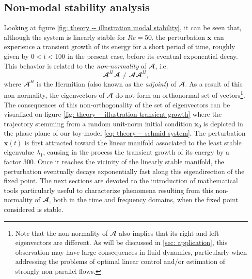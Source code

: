 
  \subsection{Non-modal stability analysis}
  \label{subsec: theory -- non-modal stability}

  Looking at figure \ref{fig: theory -- illustration modal stability}, it can be seen that, although the system is linearly stable for $Re=50$, the perturbation $\mathbf{x}$ can experience a transient growth of its energy for a short period of time, roughly given by $0 < t <100$ in the present case, before its eventual exponential decay. This behavior is related to the \emph{non-normality} of $\mathbfcal{A}$, i.e.\
  \begin{equation}
    \mathbfcal{A}^H \mathbfcal{A} \neq \mathbfcal{A} \mathbfcal{A}^H,
    \label{eq: theory -- non-normality equation}
  \end{equation}
  where $\mathbfcal{A}^H$ is the Hermitian (also known as the \emph{adjoint}) of $\mathbfcal{A}$. As a result of this non-normality, the eigenvectors of $\mathbfcal{A}$ do not form an orthonormal set of vectors\footnote{Note that the non-normality of $\mathbfcal{A}$ also implies that its right and left eigenvectors are different. As will be discussed in \textsection \ref{sec: application}, this observation may have large consequences in fluid dynamics, particularly when addressing the problems of optimal linear control and/or estimation of strongly non-parallel flows.}. The consequences of this non-orthogonality of the set of eigenvectors can be visualized on figure \ref{fig: theory -- illustration transient growth} where the trajectory stemming from a random unit-norm initial condition $\mathbf{x}_0$ is depicted in the phase plane of our toy-model \eqref{eq: theory -- schmid system}. The perturbation $\mathbf{x}(t)$ is first attracted toward the linear manifold associated to the least stable eigenvalue $\lambda_1$, causing in the process the transient growth of its energy by a factor 300. Once it reaches the vicinity of the linearly stable manifold, the perturbation eventually decays exponentially fast along this eigendirection of the fixed point. The next sections are devoted to the introduction of mathematical tools particularly useful to characterize phenomena resulting from this non-normality of $\mathbfcal{A}$, both in the time and frequency domains, when the fixed point considered is stable.


